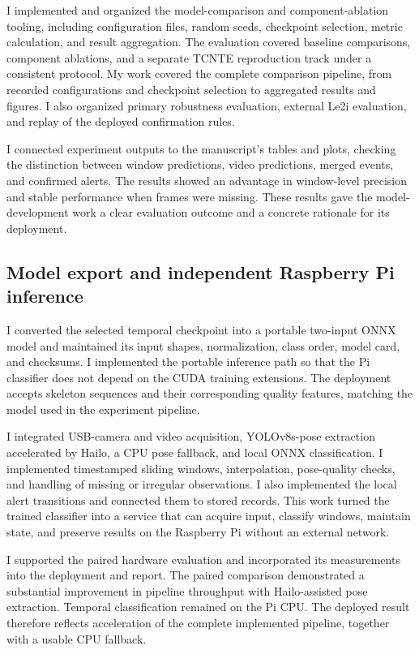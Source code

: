 \documentclass[conference,a4paper]{IEEEtran}
\begin{document}
I implemented and organized the model-comparison and component-ablation tooling, including configuration files, random seeds, checkpoint selection, metric calculation, and result aggregation. The evaluation covered baseline comparisons, component ablations, and a separate TCNTE reproduction track under a consistent protocol. My work covered the complete comparison pipeline, from recorded configurations and checkpoint selection to aggregated results and figures. I also organized primary robustness evaluation, external Le2i evaluation, and replay of the deployed confirmation rules.

I connected experiment outputs to the manuscript's tables and plots, checking the distinction between window predictions, video predictions, merged events, and confirmed alerts. The results showed an advantage in window-level precision and stable performance when frames were missing. These results gave the model-development work a clear evaluation outcome and a concrete rationale for its deployment.

\subsection{Model export and independent Raspberry Pi inference}

I converted the selected temporal checkpoint into a portable two-input ONNX model and maintained its input shapes, normalization, class order, model card, and checksums. I implemented the portable inference path so that the Pi classifier does not depend on the CUDA training extensions. The deployment accepts skeleton sequences and their corresponding quality features, matching the model used in the experiment pipeline.

I integrated USB-camera and video acquisition, YOLOv8s-pose extraction accelerated by Hailo, a CPU pose fallback, and local ONNX classification. I implemented timestamped sliding windows, interpolation, pose-quality checks, and handling of missing or irregular observations. I also implemented the local alert transitions and connected them to stored records. This work turned the trained classifier into a service that can acquire input, classify windows, maintain state, and preserve results on the Raspberry Pi without an external network.

I supported the paired hardware evaluation and incorporated its measurements into the deployment and report. The paired comparison demonstrated a substantial improvement in pipeline throughput with Hailo-assisted pose extraction. Temporal classification remained on the Pi CPU. The deployed result therefore reflects acceleration of the complete implemented pipeline, together with a usable CPU fallback.
\end{document}
